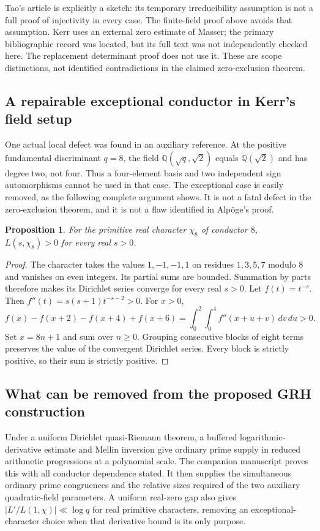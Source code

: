 \documentclass[11pt,a4paper]{article}
\newtheorem{proposition}{Proposition}[section]
\theoremstyle{remark}
\newcommand{\Q}{\mathbb Q}
\newcommand{\src}[1]{\cite{#1}}
\begin{document}
Tao's article is explicitly a sketch: its temporary irreducibility
assumption is not a full proof of injectivity in every case. The
finite-field proof above avoids that assumption. Kerr uses an
external zero estimate of Masser; the primary bibliographic record
was located, but its full text was not independently checked here.
The replacement determinant proof does not use it. These are
scope distinctions, not identified contradictions in the claimed
zero-exclusion theorem.

\subsection{A repairable exceptional conductor in Kerr's field setup}

One actual local defect was found in an auxiliary reference. At
the positive fundamental discriminant $q=8$, the field
$\Q(\sqrt q,\sqrt2)$ equals $\Q(\sqrt2)$ and has degree two,
not four. Thus a four-element basis and two independent sign
automorphisms cannot be used in that case. The exceptional case
is easily removed, as the following complete argument shows.
It is not a fatal defect in the zero-exclusion theorem, and it
is not a flaw identified in Alp\"oge's proof.\src{sz-kerr}

\begin{proposition}
For the primitive real character $\chi_8$ of conductor $8$,
$L(s,\chi_8)>0$ for every real $s>0$.
\end{proposition}
\begin{proof}
The character takes the values $1,-1,-1,1$ on residues
$1,3,5,7$ modulo $8$ and vanishes on even integers. Its
partial sums are bounded. Summation by parts therefore makes
its Dirichlet series converge for every real $s>0$.
Let $f(t)=t^{-s}$. Then $f''(t)=s(s+1)t^{-s-2}>0$.
For $x>0$,
\[
 f(x)-f(x+2)-f(x+4)+f(x+6)
 =\int_0^2\int_0^4 f''(x+u+v)\,dv\,du>0.
\]
Set $x=8n+1$ and sum over $n\ge0$. Grouping consecutive
blocks of eight terms preserves the value of the convergent
Dirichlet series. Every block is strictly positive, so their
sum is strictly positive.
\end{proof}

\subsection{What can be removed from the proposed GRH construction}

Under a uniform Dirichlet quasi-Riemann theorem, a buffered
logarithmic-derivative estimate and Mellin inversion give ordinary
prime supply in reduced arithmetic progressions at a polynomial
scale. The companion manuscript proves this with all conductor
dependence stated. It then supplies the simultaneous ordinary
prime congruences and the relative sizes required of the two
auxiliary quadratic-field parameters. A uniform real-zero gap
also gives $|L'/L(1,\chi)|\ll\log q$ for real primitive
characters, removing an exceptional-character choice when that
derivative bound is its only purpose.
\end{document}
